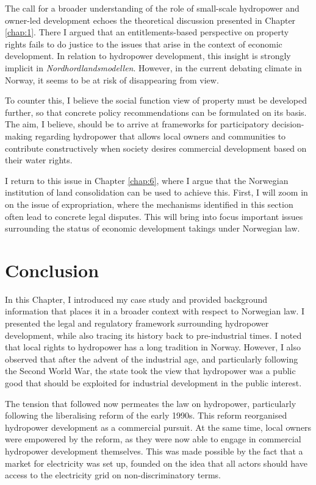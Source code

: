 The call for a broader understanding of the role of small-scale hydropower and owner-led development echoes the theoretical discussion presented in Chapter \ref{chap:1}. There I argued that an entitlements-based perspective on property rights fails to do justice to the issues that arise in the context of economic development. In relation to hydropower development, this insight is strongly implicit in {\it Nordhordlandsmodellen}. However, in the current debating climate in Norway, it seems to be at risk of disappearing from view.

To counter this, I believe the social function view of property must be developed further, so that concrete policy recommendations can be formulated on its basis. The aim, I believe, should be to arrive at frameworks for participatory decision-making regarding hydropower that allows local owners and communities to contribute constructively when society desires commercial development based on  their water rights.

I return to this issue in Chapter \ref{chap:6}, where I argue that the Norwegian institution of land consolidation can be used to achieve this. First, I will zoom in on the issue of expropriation, where the mechanisms identified in this section often lead to concrete legal disputes. This will bring into focus important issues surrounding the status of economic development takings under Norwegian law.

\section{Conclusion}\label{sec:conc3}

In this Chapter, I introduced my case study and provided background information that places it in a broader context with respect to Norwegian law. I presented the legal and regulatory framework surrounding hydropower development, while also tracing its history back to pre-industrial times. I noted that local rights to hydropower has a long tradition in Norway. However, I also observed that after the advent of the industrial age, and particularly following the Second World War, the state took the view that hydropower was a public good that should be exploited for industrial development in the public interest.

The tension that followed now permeates the law on hydropower, particularly following the liberalising reform of the early 1990s. This reform reorganised hydropower development as a commercial pursuit. At the same time, local owners were empowered by the reform, as they were now able to engage in commercial hydropower development themselves. This was made possible by the fact that a market for electricity was set up, founded on the idea that all actors should have access to the electricity grid on non-discriminatory terms. 

